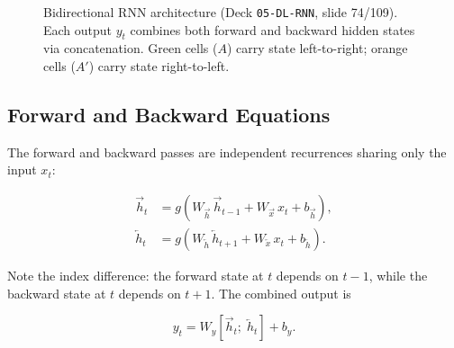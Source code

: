 \documentclass[12pt,a4paper]{article}
\begin{document}
\begin{figure}[ht]
\caption{Bidirectional RNN architecture (Deck \texttt{05-DL-RNN}, slide 74/109).
         Each output $y_t$ combines both forward and backward hidden states via
         concatenation.  Green cells ($A$) carry state left-to-right;
         orange cells ($A'$) carry state right-to-left.}
\label{fig:birnn}
\end{figure}

\subsection{Forward and Backward Equations}
\label{subsec:birnn_equations}

The forward and backward passes are independent recurrences sharing only the
input $x_t$:

\begin{align}
  \overrightarrow{h}_t &= g\!\left(
      W_{\overrightarrow{h}}\,\overrightarrow{h}_{t-1}
      + W_{\overrightarrow{x}}\,x_t + b_{\overrightarrow{h}}\right),
      \label{eq:birnn_fwd} \\[4pt]
  \overleftarrow{h}_t &= g\!\left(
      W_{\overleftarrow{h}}\,\overleftarrow{h}_{t+1}
      + W_{\overleftarrow{x}}\,x_t + b_{\overleftarrow{h}}\right).
      \label{eq:birnn_bwd}
\end{align}

Note the index difference: the forward state at $t$ depends on $t-1$, while
the backward state at $t$ depends on $t+1$.  The combined output is

\begin{equation}
  y_t = W_y\!\left[\overrightarrow{h}_t;\;\overleftarrow{h}_t\right] + b_y.
  \label{eq:birnn_combined}
\end{equation}
\end{document}
